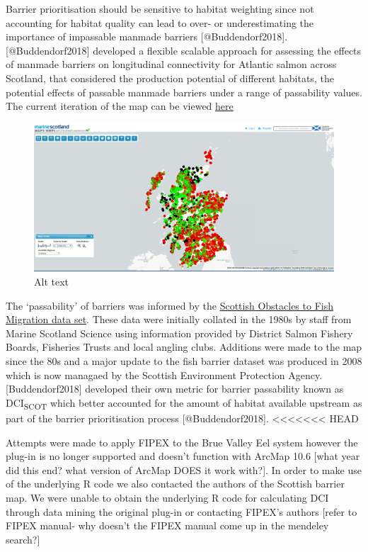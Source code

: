 \documentclass[]{article}
\begin{document}
Barrier prioritisation should be sensitive to habitat weighting since
not accounting for habitat quality can lead to over- or underestimating
the importance of impassable manmade barriers {[}@Buddendorf2018{]}.
{[}@Buddendorf2018{]} developed a flexible scalable approach for
assessing the effects of manmade barriers on longitudinal connectivity
for Atlantic salmon across Scotland, that considered the production
potential of different habitats, the potential effects of passable
manmade barriers under a range of passability values. The current
iteration of the map can be viewed
\href{http://marine.gov.scot/information/barriers-and-obstructions-freshwater-rivers}{here}

\begin{figure}
\centering
\includegraphics{Capture_ScotlandBarrierMap.jpg}
\caption{Alt text}
\end{figure}

The `passability' of barriers was informed by the
\href{https://www.sepa.org.uk/environment/environmental-data/}{Scottish
Obstacles to Fish Migration data set}. These data were initially
collated in the 1980s by staff from Marine Scotland Science using
information provided by District Salmon Fishery Boards, Fisheries Trusts
and local angling clubs. Additions were made to the map since the 80s
and a major update to the fish barrier dataset was produced in 2008
which is now managaed by the Scottish Environment Protection Agency.
{[}Buddendorf2018{]} developed their own metric for barrier passability
known as DCI\textsubscript{SCOT} which better accounted for the amount
of habitat available upstream as part of the barrier prioritisation
process {[}@Buddendorf2018{]}.
\textless{}\textless{}\textless{}\textless{}\textless{}\textless{}\textless{}
HEAD

Attempts were made to apply FIPEX to the Brue Valley Eel system however
the plug-in is no longer supported and doesn't function with ArcMap 10.6
{[}what year did this end? what version of ArcMap DOES it work with?{]}.
In order to make use of the underlying R code we also contacted the
authors of the Scottish barrier map. We were unable to obtain the
underlying R code for calculating DCI through data mining the original
plug-in or contacting FIPEX's authors {[}refer to FIPEX manual- why
doesn't the FIPEX manual come up in the mendeley search?{]}
\end{document}
